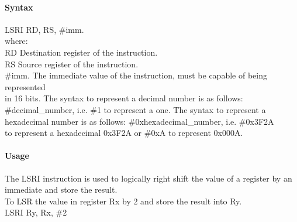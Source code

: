 \documentclass[12pt]{article}
\begin{document}
    \paragraph{Syntax}
    \begin{flushleft}
    LSRI RD, RS, \#imm.\\
    \vspace{1em}        %
    where:\\
    \vspace{1em}
    RD  \hspace{3.6em} Destination register of the instruction.\\
    \vspace{1em}
    RS  \hspace{3.85em} Source register of the instruction.\\
    \vspace{1em}
    \#imm.  \hspace{1.8em} The immediate value of the instruction, must be capable of being represented\\             \hspace{5.4em} in 16 bits. The syntax to represent a decimal number is as follows:\\
            \hspace{5.4em} \#decimal\_number, i.e. \#1 to represent a one. The syntax to represent a\\
            \hspace{5.4em} hexadecimal number is as follows: \#0xhexadecimal\_number, i.e. \#0x3F2A \\
            \hspace{5.4em} to represent a hexadecimal 0x3F2A or \#0xA to represent 0x000A.\\
    \end{flushleft}
    
    \paragraph{Usage}
    \begin{flushleft}
    The LSRI instruction is used to logically right shift the value of a register by an immediate and store the result.\\ 
    \vspace{1em}
    To LSR the value in register Rx by 2 and store the result into Ry.\\
    \vspace{1em}
    LSRI Ry, Rx, \#2
    \end{flushleft}
    
\end{document}

